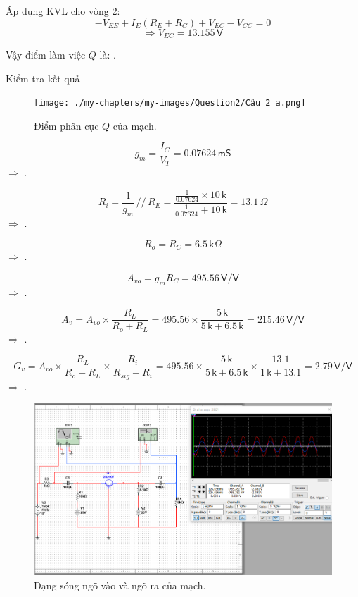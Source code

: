 Áp dụng KVL cho vòng 2:
\[
- V_{EE}+I_{E}(R_{E}+R_{C})+V_{EC}-V_{CC}=0
\]
\[
\Rightarrow V_{EC}=13.155\,\textsf{V}
\]

Vậy điểm làm việc $Q$ là: .

Kiểm tra kết quả
\begin{figure}[H]
	\centering
	\texttt{[image: ./my-chapters/my-images/Question2/Câu 2 a.png]}
	\caption{Điểm phân cực $Q$ của mạch.}
\end{figure}


\[
g_{m}=\frac{I_{C}}{V_{T}}=0.07624\,\textsf{mS}
\]
$\Rightarrow$ .

\[
R_{i}=\frac{1}{g_{m}}\,//\,R_{E}=\frac{\frac{1}{0.07624}\times10\,\textsf{k}}{\frac{1}{0.07624}+10\,\textsf{k}}=13.1\,\Omega
\]
$\Rightarrow$ .

\[
R_{o}=R_{C}=6.5\,\textsf{k}\Omega
\]
$\Rightarrow$ .

\[
A_{vo}=g_{m}R_{C}=495.56\,\textsf{V/V}
\]
$\Rightarrow$ .

\[
A_{v}=A_{vo}\times\frac{R_{L}}{R_{o}+R_{L}}=495.56\times\frac{5\,\textsf{k}}{5\,\textsf{k}+6.5\,\textsf{k}}=215.46\,\textsf{V/V}
\]
$\Rightarrow$ .

\[
G_{v}=A_{vo}\times\frac{R_{L}}{R_{o}+R_{L}}\times\frac{R_{i}}{R_{sig}+R_{i}}=495.56\times\frac{5\,\textsf{k}}{5\,\textsf{k}+6.5\,\textsf{k}}\times\frac{13.1}{1\,\textsf{k}+13.1}=2.79\,\textsf{V/V}
\]
$\Rightarrow$ .

\begin{figure}[H]
	\centering
	\includegraphics[width=\linewidth]{./my-chapters/my-images/Question2/Câu 2 b - Sóng .png}
	\caption{Dạng sóng ngõ vào và ngõ ra của mạch.}
\end{figure}

